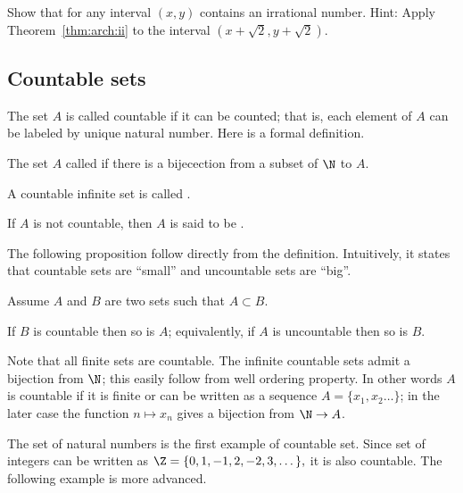 \documentclass[12pt]{book}
\begin{document}
\begin{exercise}\label{ex:irrationals-are-dense}
Show that for any interval $(x,y)$ contains an irrational number.
Hint: Apply Theorem~\ref{thm:arch:ii} to the interval $(x+\sqrt{2},y+\sqrt{2})$.
\end{exercise}



\subsection*{Countable sets}
\label{sec:intandsizeR}


The set $A$ is called countable if it can be counted;
that is, each element of $A$ can be labeled by unique natural number. 
Here is a formal definition.

\begin{defn}\label{def:countabe-simple}
The set $A$ called \emph{} if there is a bijecection from a subset of $\N$ to $A$.

A countable infinite set is called \emph{}.

If $A$ is not countable, then $A$ is said to be \emph{}.
\end{defn}

The following proposition follow directly from the definition.
Intuitively, it states that countable sets are ``small'' and uncountable sets are ``big''.

\begin{prop}\label{prop:countable-subset}
Assume $A$ and $B$ are two sets such that $A\subset B$.

If $B$ is countable then so is $A$; 
equivalently, 
if $A$ is uncountable then so is $B$.
\end{prop}

Note that all finite sets are countable.
The infinite countable sets admit a bijection from $\N$;
this easily follow from well ordering property.
In other words $A$ is countable if it is finite or can be written as a sequence $A=\{x_1,x_2\dots\}$;
in the later case the function $n\mapsto x_n$ gives a bijection from $\N\to A$.

The set of natural numbers is the first example of countable set.
Since set of integers can be written as 
$\Z=\{0,1,-1,2,-2,3,\dots\},$
it is also countable.
The following example is more advanced.
\end{document}
